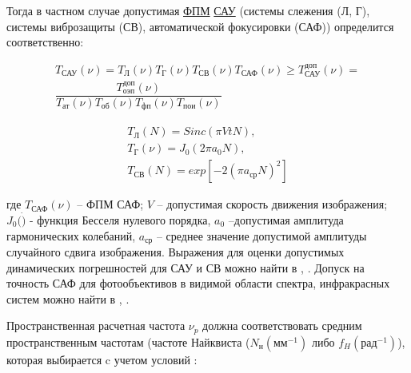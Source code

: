 Тогда в частном случае допустимая \hyperref[acroFPM]{ФПМ} \hyperref[acroSAU]{САУ} (системы слежения (Л, Г), системы виброзащиты (СВ), автоматической фокусировки (САФ)) определится соответственно: 

\begin{equation}
\label{eq:p2:6}
\begin{alignedat}{2}
T_{\textit{САУ}}\left(\nu\right)=
T_\textit{Л}\left(\nu\right)T_\textit{Г}\left(\nu\right)T_{\textit{СВ}}\left(\nu\right)T_{\textit{САФ}}\left(\nu\right)\geq{}T_{\textit{САУ}}^{\textit{доп}}(\nu)= \\
\dfrac{ T_{\textit{оэп}}^{\textit{доп}}(\nu) }{ T_{\textit{ат}}(\nu)T_{\textit{об}}(\nu)T_{\textit{фп}}(\nu)T_{\textit{пои}}(\nu) }
\end{alignedat}
\end{equation}

\begin{equation}
\label{eq:p2:7}
\begin{alignedat}{3}
T_\textit{Л}\left(N\right)=Sinc(\pi{}VtN) , \\
T_{\textit{Г}}(\nu)=J_0\left(2\pi{}a_0N\right) , \\
T_{\textit{СВ}}\left(N\right) = exp[-2{(\pi{}a_{\textit{ср}}N)}^2]
\end{alignedat}
\end{equation}

где $T_{\textit{САФ}}(\nu)$ – ФПМ САФ; 
$V$ – допустимая скорость движения изображения; 
$J_0(\dot)$ - функция Бесселя нулевого порядка, 
$a_0$ –допустимая амплитуда гармонических колебаний, 
$a_{\textit{ср}}$ – среднее значение допустимой амплитуды случайного сдвига изображения. 
Выражения для оценки допустимых динамических погрешностей для САУ и СВ можно найти в \cite[]{Karpov}, \cite[]{Karpov23}. Допуск на точность САФ для фотообъективов в видимой области спектра, инфракрасных систем можно найти в \cite[]{Tarasov}, \cite[]{Belyakov}.

Пространственная расчетная частота $\nu_p$ должна соответствовать средним пространственным частотам (частоте Найквиста ($N_{\textit{н}} (\textit{мм}^{-1})$ либо $f_H (\textit{рад}^{-1})$), которая выбирается c учетом условий \cite[]{Tarasov}: 

